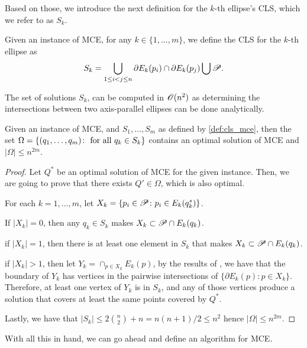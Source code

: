 Based on those, we introduce the next definition for the $k$-th ellipse's CLS, which we refer to as $S_k$.

\begin{definition}\label{def:cls_mce}
	Given an instance of MCE, for any $k \in \{1, \dots, m\}$, we define the CLS for the $k$-th ellipse as
	\begin{equation}
	S_k = \bigcup_{1 \le i < j \le n} \partial E_k(p_i) \cap \partial E_k(p_j) \bigcup \mathscr{P}.
	\end{equation}
\end{definition}

The set of solutions $S_k$, can be computed in $\mathscr{O}(n^2)$ as determining the intersections between two axis-parallel ellipses can be done analytically. 

\begin{lem}
	Given an instance of MCE, and $S_1, \dots, S_m$ as defined by \autoref{def:cls_mce}, then the set $\Omega = \{(q_1, \dots, q_m) \colon \textnormal{ for all }q_k \in S_k \}$ contains an optimal solution of MCE and $|\Omega| \le n^{2m}$. 
\end{lem}
\begin{proof}
	Let $Q^*$ be an optimal solution of MCE for the given instance. Then, we are going to prove that there exists $Q' \in \Omega$, which is also optimal.
	
	For each $k=1, \dots, m$, let $X_k = \{p_i \in \mathscr{P}\colon p_i \in E_k(q_k^*)\}$.
	
	If $|X_k| = 0$, then any $q_k \in S_k$ makes $X_k \subset \mathscr{P} \cap E_k(q_k)$.
	
	if $|X_k| = 1$, then there is at least one element in $S_k$ that makes $X_k \subset \mathscr{P} \cap E_k(q_k)$.
	
	if $|X_k| > 1$, then let $Y_k = \cap_{p \in X_k}E_k(p)$, by the results of \cite{bi}, we have that the boundary of $Y_k$ has vertices in the pairwise intersections of $\{\partial E_k(p) \colon p \in X_k\}$. Therefore, at least one vertex of $Y_k$ is in $S_k$, and any of those vertices produce a solution that covers at least the same points covered by $Q^*$.
	
	Lastly, we have that $|S_k| \le 2\binom{n}{2} + n = n(n+1)/2 \le n^2$ hence $|\Omega| \le n^{2m}$.
\end{proof}

With all this in hand, we can go ahead and define an algorithm for MCE.

